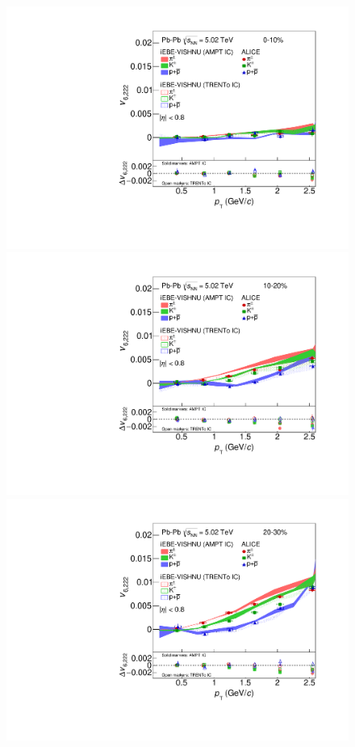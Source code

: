 \begin{figure}[!htb]
\begin{center}
\includegraphics[scale=0.26]{figures/model/TrentoAndAMPT_v6222_gap00_new_0-10_PID2.pdf}
\includegraphics[scale=0.26]{figures/model/TrentoAndAMPT_v6222_gap00_new_10-20_PID2.pdf}
\includegraphics[scale=0.26]{figures/model/TrentoAndAMPT_v6222_gap00_new_20-30_PID2.pdf}

\end{center}
\end{figure}
